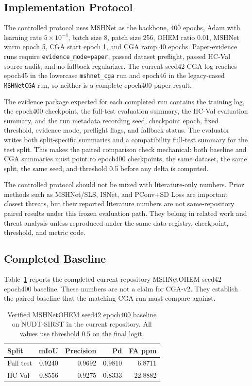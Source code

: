 \documentclass[letterpaper]{article}
\begin{document}
\subsection{Implementation Protocol}

The controlled protocol uses MSHNet as the backbone, 400 epochs, Adam with learning rate $5 \times 10^{-4}$, batch size 8, patch size 256, OHEM ratio 0.01, MSHNet warm epoch 5, CGA start epoch 1, and CGA ramp 40 epochs. Paper-evidence runs require \texttt{evidence\_mode=paper}, passed dataset preflight, passed HC-Val source audit, and no fallback regularizer. The current seed42 CGA log reaches epoch45 in the lowercase \texttt{mshnet\_cga} run and epoch46 in the legacy-cased \texttt{MSHNetCGA} run, so neither is a complete epoch400 paper result.

The evidence package expected for each completed run contains the training log, the epoch400 checkpoint, the full-test evaluation summary, the HC-Val evaluation summary, and the run metadata recording seed, checkpoint epoch, fixed threshold, evidence mode, preflight flags, and fallback status. The evaluator writes both split-specific summaries and a compatibility full-test summary for the test split. This makes the paired comparison check mechanical: both baseline and CGA summaries must point to epoch400 checkpoints, the same dataset, the same split, the same seed, and threshold 0.5 before any delta is computed.

The controlled protocol should not be mixed with literature-only numbers. Prior methods such as MSHNet/SLS, ISNet, and PConv+SD Loss are important closest threats, but their reported literature numbers are not same-repository paired results under this frozen evaluation path. They belong in related work and threat analysis unless reproduced under the same data registry, checkpoint, threshold, and metric code.

\subsection{Completed Baseline}

Table~\ref{tab:ohem-baseline} reports the completed current-repository MSHNetOHEM seed42 epoch400 baseline. These numbers are not a claim for CGA-v2. They establish the paired baseline that the matching CGA run must compare against.

\begin{table}[t]
\centering
\caption{Verified MSHNetOHEM seed42 epoch400 baseline on NUDT-SIRST in the current repository. All values use threshold 0.5 on the final logit.}
\label{tab:ohem-baseline}
\small
\begin{tabular}{lrrrr}
\toprule
Split & mIoU & Precision & Pd & FA ppm \\
\midrule
Full test & 0.9240 & 0.9692 & 0.9810 & 6.8711 \\
HC-Val & 0.8556 & 0.9275 & 0.8333 & 22.8882 \\
\bottomrule
\end{tabular}
\end{table}
\end{document}
